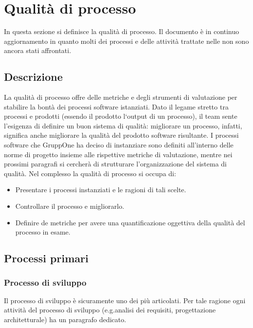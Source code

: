 \documentclass[../piano-di-qualifica.tex]{subfiles}
\begin{document}
\section{Qualità di processo}%
\label{sec:qualità_di_processo}
In questa sezione si definisce la qualità di processo. Il documento è in continuo aggiornamento in quanto molti dei processi e delle attività trattate nelle  non sono ancora stati affrontati.

\subsection{Descrizione}%
\label{sub:descrizione}

La qualità di processo offre delle metriche e degli strumenti di valutazione per stabilire la bontà dei processi software istanziati. 
Dato il legame stretto tra processi e prodotti (essendo il prodotto l`output di un processo), il team sente l'esigenza di definire un buon sistema di qualità: migliorare un processo, infatti, significa anche migliorare la qualità del prodotto software risultante. 
I processi software che GruppOne ha deciso di instanziare sono definiti all'interno delle norme di progetto insieme alle rispettive metriche di valutazione, mentre nei prossimi paragrafi si cercherà di strutturare l'organizzazione del sistema di qualità. 
Nel complesso la qualità di processo si occupa di:
\begin{itemize}
	\item Presentare i processi instanziati e le ragioni di tali scelte.
	\item Controllare il processo e migliorarlo.
	\item Definire de metriche per avere una quantificazione oggettiva della qualità del processo in esame.
\end{itemize}

\subsection{Processi primari}%
\label{sub:processi_primari}

\subsubsection{Processo di sviluppo}%
\label{subs:processo_di_sviluppo}
Il processo di sviluppo è sicuramente uno dei più articolati. Per tale ragione ogni attività del processo di sviluppo (e.g.analisi dei requisiti, progettazione architetturale) ha un paragrafo dedicato.
\end{document}
